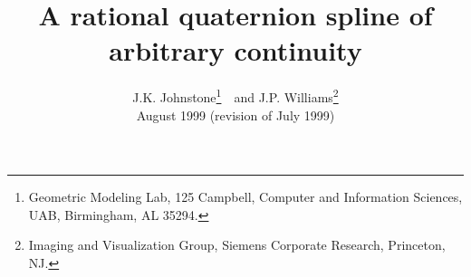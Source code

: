 \newif\ifFull
\Fullfalse

\newcommand{\add}[1]{#1}		%
\SingleSpace

\setlength{\oddsidemargin}{0pt}
\setlength{\topmargin}{.5in}	%
\setlength{\textheight}{8.5in}
\setlength{\textwidth}{6.5in}
\setlength{\columnsep}{5mm}	%

\title{A rational quaternion spline of arbitrary continuity}
\author{J.K. Johnstone\thanks{Geometric Modeling Lab, 125 Campbell,
	Computer and Information Sciences, 
	UAB, Birmingham, AL 35294.}\ \ and 
	J.P. Williams\thanks{Imaging and Visualization Group,
	Siemens Corporate Research, Princeton, NJ.}\\August 1999 (revision of July 1999)}


\maketitle

